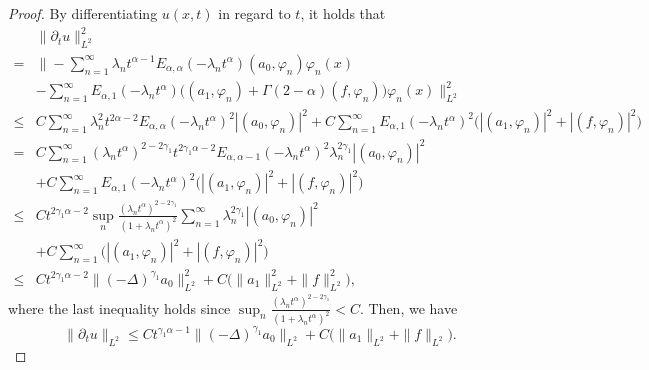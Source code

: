 \documentclass[11pt]{article}
\numberwithin{equation}{section}
\begin{document}
\begin{proof}
By differentiating $u(x,t)$ in regard to $t$, it holds that
\begin{align*}
&\|\partial_{t}u\|_{L^2}^2\\
=&\bigg\|-\sum_{n=1}^{\infty}\lambda_nt^{\alpha-1}E_{\alpha,\alpha}(-\lambda_nt^\alpha)(a_0,\varphi_n)\varphi_n(x)\\
&-\sum_{n=1}^{\infty} E_{\alpha,1}(-\lambda_n t^\alpha)\Big((a_1, \varphi_n)+\Gamma(2-\alpha)(f, \varphi_n)\Big)  \varphi_n(x)\bigg\|_{L^2}^2\\
\le&C\sum_{n=1}^{\infty}\lambda_n^2t^{2\alpha-2}E_{\alpha,\alpha}(-\lambda_nt^\alpha)^2|(a_0,\varphi_n)|^2
+C\sum_{n=1}^{\infty}E_{\alpha,1}(-\lambda_nt^\alpha)^2\Big(|(a_1, \varphi_n)|^2+|(f, \varphi_n)|^2\Big)\\
=&C\sum_{n=1}^{\infty}(\lambda_nt^\alpha)^{2-2\gamma_1}t^{2\gamma_1\alpha-2}E_{\alpha,\alpha-1}(-\lambda_nt^\alpha)^2\lambda_n^{2\gamma_1}|(a_0,\varphi_n)|^2\\
&+C\sum_{n=1}^{\infty}E_{\alpha,1}(-\lambda_n t^\alpha)^2\Big(|(a_1, \varphi_n)|^2+|(f, \varphi_n)|^2\Big)\\
\le&Ct^{2\gamma_1\alpha-2}\sup_n\frac{(\lambda_nt^\alpha)^{2-2\gamma_1}}{(1+\lambda_nt^\alpha)^2}\sum_{n=1}^{\infty}\lambda_n^{2\gamma_1}|(a_0,\varphi_n)|^2\\
&+C\sum_{n=1}^{\infty}\Big(|(a_1, \varphi_n)|^2+|(f, \varphi_n)|^2\Big)\\
\le&Ct^{2\gamma_1\alpha-2}\|(-\Delta)^{\gamma_1}a_0\|_{L^2}^2 +C\Big(\|a_1\|_{L^2}^2+\|f\|_{L^2}^2\Big),
\end{align*}
where the last inequality holds since $\sup_n\frac{(\lambda_nt^\alpha)^{2-2\gamma_1}}{(1+\lambda_nt^\alpha)^2}<C$.   
Then, we have
\[
\|\partial_{t}u\|_{L^2} \leq Ct^{\gamma_1\alpha-1}\|(-\Delta)^{\gamma_1}a_0\|_{L^2}
+C\Big(\|a_1\|_{L^2}+\|f\|_{L^2}\Big).
\]


\end{proof}
\end{document}
